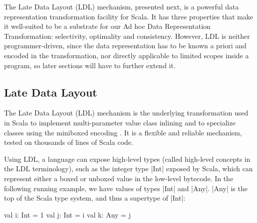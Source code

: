 The Late Data Layout (LDL) mechanism, presented next, is a powerful data
representation transformation facility for Scala.  It has three
properties that make it well-suited to be a substrate for our Ad hoc
Data Representation Transformation: selectivity, optimality and
consistency. However, LDL is neither programmer-driven, since the
data representation has to be known a priori and encoded in the
transformation, nor directly applicable to limited scopes inside a program,
so later sections will have to further extend it.


\subsection{Late Data Layout}

The Late Data Layout (LDL) mechanism \cite{ldl} is the underlying transformation used in Scala to implement multi-parameter value class inlining and to specialize classes using the miniboxed encoding \cite{miniboxing}. It is a flexible and reliable mechanism, tested on thousands of lines of Scala code.



Using LDL, a language can expose high-level types (called high-level concepts in the LDL terminology), such as the integer type |Int| exposed by Scala, which can represent either a boxed or unboxed value in the low-level bytecode. In the following running example, we have values of types |Int| and |Any|. |Any| is the top of the Scala type system, and thus a supertype of |Int|:

\begin{lstlisting-nobreak}
val i: Int = 1
val j: Int = i
val k: Any = j
\end{lstlisting-nobreak}

